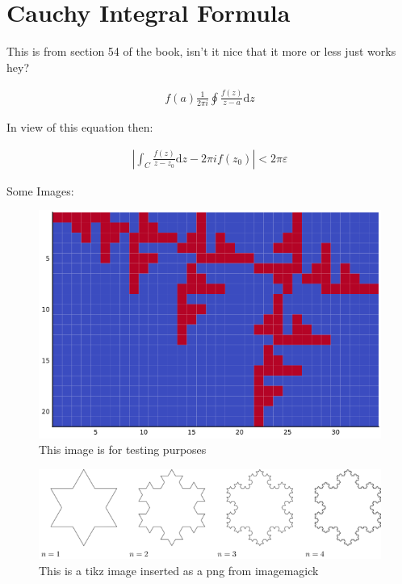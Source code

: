 \documentclass[11pt]{article}
\author{Ryan Greenup \& James Guerra}
\date{\today}
\title{}
\begin{document}
\tableofcontents


\section{Cauchy Integral Formula}
\label{cauchy-integral-formula}
This is from section 54 of the book, isn't it nice that it more or less
just works hey? \cite{zhangMakingEigenvectorBasedReputation2004}

\begin{align}
f\left( a \right) \frac{1}{2\pi i} \oint \frac{f\left( z \right)}{z- a}\mathrm{d}z
\end{align}

In view of this equation then: \cite{zhangMakingEigenvectorBasedReputation2004}

$$\begin{aligned}
\left| \int_C \frac{f\left( z \right)}{z- z_0} \mathrm{d}z - 2 \pi i f\left( z_0 \right) \right|<2 \pi \varepsilon
\end{aligned}$$

Some Images: \cite{ngStableAlgorithmsLink2001}

\begin{figure}[htbp]
\centering
\includegraphics[width=12cm]{media/my-self-rep-frac.png}
\caption{\label{testim}This image is for testing purposes \cite{moskowitzLibraryGuidesWikipedia}}
\end{figure}

\begin{figure}[htbp]
\centering
\includegraphics[width=12cm]{media/tikz/Snowflake.png}
\caption{\label{testtikzins}This is a tikz image inserted as a png from imagemagick}
\end{figure}
\end{document}

